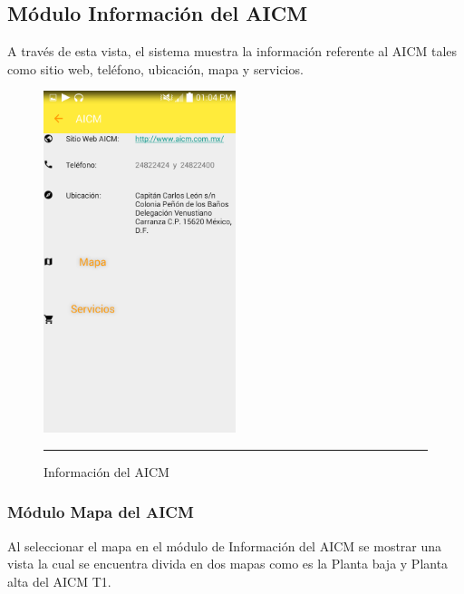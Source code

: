 \subsection{Módulo Información del AICM}
A través de esta vista, el sistema muestra la información referente al AICM tales como sitio web, teléfono, ubicación, mapa y servicios.

\begin{figure}[h]
	\centering
		\includegraphics[width=0.5\textwidth]{Figuras/infoaicm.png}
		\rule{30em}{0.5pt}
	\caption[Información del AICM]{Información del AICM}
	\label{fig:infoAICM}
\end{figure}
\clearpage

\subsubsection{Módulo Mapa del AICM}
Al seleccionar el mapa en el módulo de Información del AICM se mostrar una vista la cual se encuentra divida en dos mapas como es la Planta baja y Planta alta del AICM T1.

